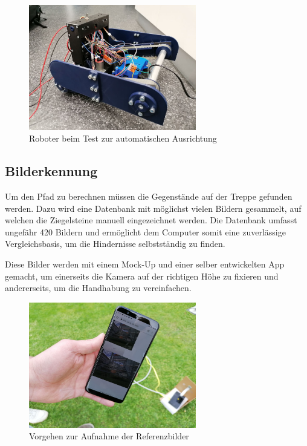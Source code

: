 \begin{figure}[H]
  \includegraphics[width=0.65\textwidth]{img/Sprint2/pren2_ausrichten-anfahren.jpg}
  \centering
  \caption{Roboter beim Test zur automatischen Ausrichtung}
  \label{fig:sprint-backlog-1}
  \end{figure}
  
  
\subsection{Bilderkennung}

Um den Pfad zu berechnen müssen die Gegenstände auf der Treppe gefunden werden. Dazu wird eine Datenbank mit möglichst vielen Bildern gesammelt, auf welchen die Ziegelsteine manuell eingezeichnet werden. Die Datenbank umfasst ungefähr 420 Bildern und ermöglicht dem Computer somit eine zuverlässige Vergleichsbasis, um die Hindernisse selbstständig zu finden.

Diese Bilder werden mit einem Mock-Up und einer selber entwickelten App gemacht, um einerseits die Kamera auf der richtigen Höhe zu fixieren und andererseits, um die Handhabung zu vereinfachen.



\begin{figure}[H]
  \includegraphics[width=0.65\textwidth]{img/Sprint3/Sprint3_Bildersammlung.jpeg}
  \centering
  \caption{Vorgehen zur Aufnahme der Referenzbilder}
  \label{fig:Aufnahme der Referenzbilder}
  \end{figure}
  
